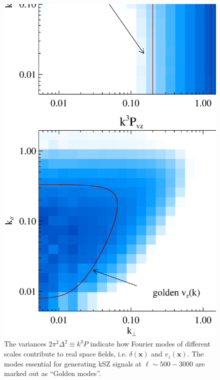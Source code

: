\begin{figure}[btp]
\captionsetup{width=0.28\linewidth,justification=raggedright}
\begin{minipage}[t]{0.33\linewidth}
\begin{center}
\includegraphics[width=\textwidth,height=1.7\textwidth]{figure/k3pd_k3pv_z1_note.eps}
\end{center}
\vspace{-0.7cm}
\caption{
The variances $2\pi^2\Delta^2\equiv k^3P$ indicate how Fourier modes of different scales contribute to real space fields, i.e. $\delta(\bm{x})$ and $v_z(\bm{x})$. The modes essential for generating kSZ signals at $\ell\sim 500-3000$ are marked out as ``Golden modes''. 
}
\end{minipage}
\end{figure}
